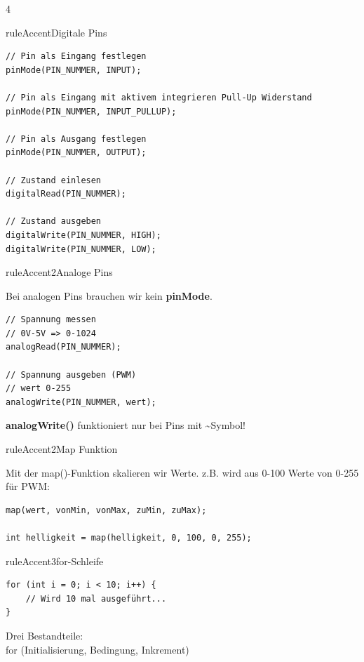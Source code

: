\documentclass[a4paper,10pt,landscape]{article}
\begin{document}
\begin{multicols}{4}
\begin{regelbox}{ruleAccent}{\faBolt\enspace Digitale Pins}
\begin{lstlisting}
// Pin als Eingang festlegen
pinMode(PIN_NUMMER, INPUT);

// Pin als Eingang mit aktivem integrieren Pull-Up Widerstand
pinMode(PIN_NUMMER, INPUT_PULLUP);

// Pin als Ausgang festlegen
pinMode(PIN_NUMMER, OUTPUT);

// Zustand einlesen
digitalRead(PIN_NUMMER);

// Zustand ausgeben
digitalWrite(PIN_NUMMER, HIGH);
digitalWrite(PIN_NUMMER, LOW);
\end{lstlisting}
\end{regelbox}

\begin{regelbox}{ruleAccent2}{\faWaveSquare\enspace Analoge Pins}

Bei analogen Pins brauchen wir kein \textbf{pinMode}.

\begin{lstlisting}
// Spannung messen
// 0V-5V => 0-1024
analogRead(PIN_NUMMER);

// Spannung ausgeben (PWM)
// wert 0-255
analogWrite(PIN_NUMMER, wert);
\end{lstlisting}

\textbf{analogWrite()} funktioniert nur bei Pins mit \textasciitilde Symbol!\\

\end{regelbox}

\begin{regelbox}{ruleAccent2}{\faArrowRight\enspace Map Funktion}

Mit der map()-Funktion skalieren wir Werte.
z.B. wird aus 0-100 Werte von 0-255 für PWM:

\begin{lstlisting}
map(wert, vonMin, vonMax, zuMin, zuMax);

int helligkeit = map(helligkeit, 0, 100, 0, 255);
\end{lstlisting}

\end{regelbox}

\begin{regelbox}{ruleAccent3}{\faSync\enspace for-Schleife}
\begin{lstlisting}
for (int i = 0; i < 10; i++) {
	// Wird 10 mal ausgeführt...
}
\end{lstlisting}
Drei Bestandteile:\\
for (Initialisierung, Bedingung, Inkrement)
\end{regelbox}


\end{multicols}
\end{document}
